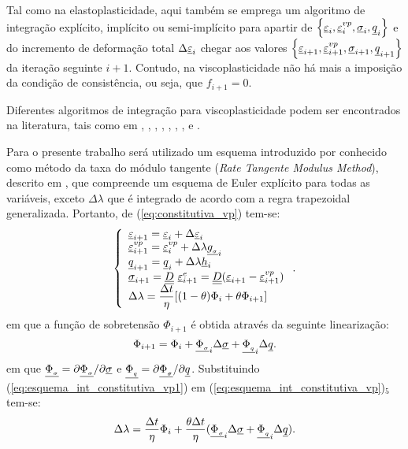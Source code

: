 Tal como na elastoplasticidade, aqui também se emprega um algoritmo de integração explícito, implícito ou semi-implícito para apartir de $\left\{ \underline{\varepsilon}_i, \underline{\varepsilon}_i^{vp},\underline \sigma_i,\underline q_i \right\}$ e do incremento de deformação total $\Delta \underline{\varepsilon}_i$ chegar aos valores $\left\{ \underline{\varepsilon}_{i+1}, \underline{\varepsilon}_{i+1}^{vp},\underline \sigma_{i+1},\underline q_{i+1} \right\}$  da iteração seguinte $i+1$. Contudo, na viscoplasticidade não há mais a imposição da condição de consistência, ou seja, que $f_{i+1} = 0$.

Diferentes algoritmos de integração para viscoplasticidade podem ser encontrados na literatura, tais como em , ,  , , , , ,  e .

Para o presente trabalho será utilizado um esquema introduzido por  conhecido como método da taxa do módulo tangente (\textit{Rate Tangente Modulus Method}), descrito em , que compreende um esquema de Euler explícito para todas as variáveis, exceto $\Delta \lambda$ que é integrado de acordo com a regra trapezoidal generalizada. Portanto, de (\ref{eq:constitutiva_vp}) tem-se:
\begin{equation}
	\label{eq:esquema_int_constitutiva_vp}
	\left\{
	\begin{array}{lcl}
		\underline{\varepsilon}_{i+1} = \underline{\varepsilon}_i + \Delta \underline{\varepsilon}_i \\
		\underline{\varepsilon}_{i+1}^{vp} = \underline{\varepsilon}_i^{vp} + \Delta \lambda \underline{g_{_\sigma}}_i \\
		\underline q_{i+1} = \underline q_i + \Delta \lambda \underline h_i \\	
		\underline \sigma_{i+1} = \underline{\underline D}~\underline{\varepsilon}_{i+1}^e = \underline{\underline D}(\underline{\varepsilon}_{i+1} - \underline{\varepsilon}_{i+1}^{vp}) \\
		\Delta \lambda = \dfrac{\Delta t}{\eta}[(1-\theta)\Phi_i + \theta \Phi_{i+1}]
	\end{array}
	\right..
\end{equation}
em que a função de sobretensão $\Phi_{i+1}$ é obtida através da seguinte linearização:
\begin{equation}
	\label{eq:esquema_int_constitutiva_vp1}
	\Phi_{i+1} = \Phi_i + \underline{\Phi_{_\sigma}}_i \Delta \underline \sigma + \underline{\Phi_{_q}}_i \Delta \underline q.
\end{equation}
em que $\underline{\Phi_{_\sigma}} = \partial \underline{\Phi_{_\sigma}} / \partial \underline \sigma$ e $\underline{\Phi_{_q}} = \partial \underline{\Phi_{_\sigma}} / \partial \underline q$. Substituindo (\ref{eq:esquema_int_constitutiva_vp1}) em (\ref{eq:esquema_int_constitutiva_vp})$_5$ tem-se:
\begin{equation}
	\label{eq:esquema_int_constitutiva_vp2}
	\Delta \lambda = \dfrac{\Delta t}{\eta} \Phi_i + \dfrac{\theta \Delta t}{\eta}(\underline{\Phi_{_\sigma}}_i \Delta \underline \sigma + \underline{\Phi_{_q}}_i \Delta \underline q).
\end{equation}

